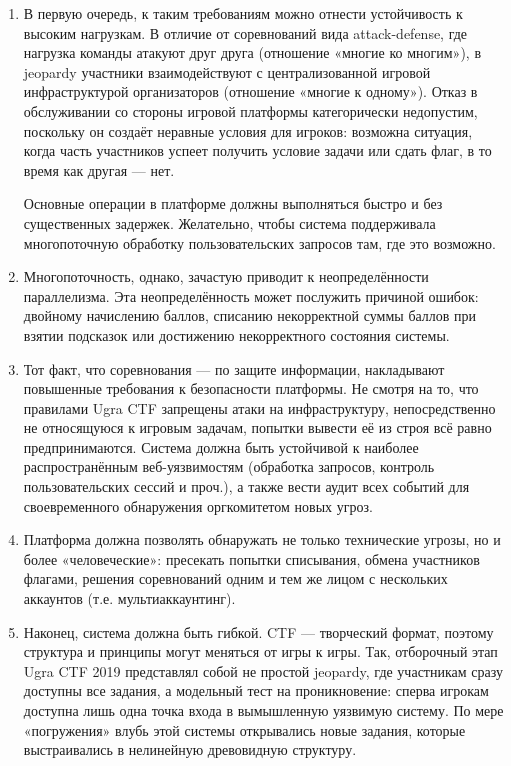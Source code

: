 \begin{enumerate}

\item
В первую очередь, к таким требованиям можно отнести устойчивость к высоким нагрузкам. В отличие от соревнований вида attack-defense, где нагрузка команды атакуют друг друга (отношение «многие ко многим»), в jeopardy участники взаимодействуют с централизованной игровой инфраструктурой организаторов (отношение «многие к одному»). Отказ в обслуживании со стороны игровой платформы категорически недопустим, поскольку он создаёт неравные условия для игроков: возможна ситуация, когда часть участников успеет получить условие задачи или сдать флаг, в то время как другая --- нет.

Основные операции в платформе должны выполняться быстро и без существенных задержек. Желательно, чтобы система поддерживала многопоточную обработку пользовательских запросов там, где это возможно.

\item
Многопоточность, однако, зачастую приводит к неопределённости параллелизма. Эта неопределённость может послужить причиной ошибок: двойному начислению баллов, списанию некорректной суммы баллов при взятии подсказок или достижению некорректного состояния системы.


\item
Тот факт, что соревнования --- по защите информации, накладывают повышенные требования к безопасности платформы. Не смотря на то, что правилами Ugra CTF запрещены атаки на инфраструктуру, непосредственно не относящуюся к игровым задачам, попытки вывести её из строя всё равно предпринимаются. Система должна быть устойчивой к наиболее распространённым веб-уязвимостям (обработка запросов, контроль пользовательских сессий и проч.), а также вести аудит всех событий для своевременного обнаружения оргкомитетом новых угроз.

\item
Платформа должна позволять обнаружать не только технические угрозы, но и более «человеческие»: пресекать попытки списывания, обмена участников флагами, решения соревнований одним и тем же лицом с нескольких аккаунтов (т.е. мультиаккаунтинг).

\item
Наконец, система должна быть гибкой. CTF --- творческий формат, поэтому структура и принципы могут меняться от игры к игры. Так, отборочный этап Ugra CTF 2019 представлял собой не простой jeopardy, где участникам сразу доступны все задания, а модельный тест на проникновение: сперва игрокам доступна лишь одна точка входа в вымышленную уязвимую систему. По мере «погружения» влубь этой системы открывались новые задания, которые выстраивались в нелинейную древовидную структуру\cite{UgraCTF19Q}.
\end{enumerate}


